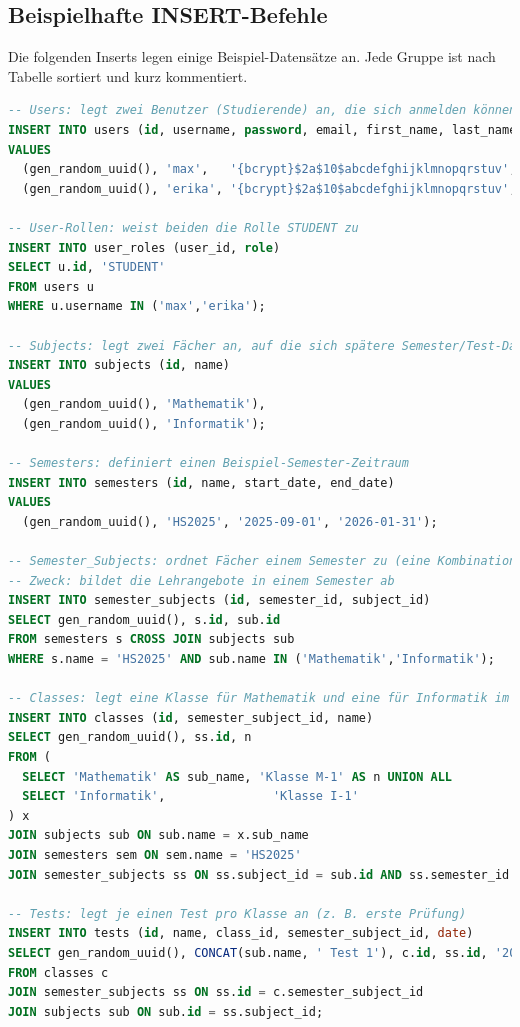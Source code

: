 \documentclass[12pt,a4paper]{article}
\begin{document}
    \subsection{Beispielhafte INSERT-Befehle}
    \noindent Die folgenden Inserts legen einige Beispiel-Datensätze an. Jede Gruppe ist nach Tabelle sortiert und kurz kommentiert.
    \begin{lstlisting}[language=SQL]
-- Users: legt zwei Benutzer (Studierende) an, die sich anmelden können
INSERT INTO users (id, username, password, email, first_name, last_name, active, created_at, updated_at)
VALUES
  (gen_random_uuid(), 'max',   '{bcrypt}$2a$10$abcdefghijklmnopqrstuv', 'max@uni.de',   'Max',   'Mustermann', true, now(), now()),
  (gen_random_uuid(), 'erika', '{bcrypt}$2a$10$abcdefghijklmnopqrstuv', 'erika@uni.de', 'Erika', 'Musterfrau', true, now(), now());

-- User-Rollen: weist beiden die Rolle STUDENT zu
INSERT INTO user_roles (user_id, role)
SELECT u.id, 'STUDENT'
FROM users u
WHERE u.username IN ('max','erika');

-- Subjects: legt zwei Fächer an, auf die sich spätere Semester/Test-Daten beziehen
INSERT INTO subjects (id, name)
VALUES
  (gen_random_uuid(), 'Mathematik'),
  (gen_random_uuid(), 'Informatik');

-- Semesters: definiert einen Beispiel-Semester-Zeitraum
INSERT INTO semesters (id, name, start_date, end_date)
VALUES
  (gen_random_uuid(), 'HS2025', '2025-09-01', '2026-01-31');

-- Semester_Subjects: ordnet Fächer einem Semester zu (eine Kombination pro Zeile)
-- Zweck: bildet die Lehrangebote in einem Semester ab
INSERT INTO semester_subjects (id, semester_id, subject_id)
SELECT gen_random_uuid(), s.id, sub.id
FROM semesters s CROSS JOIN subjects sub
WHERE s.name = 'HS2025' AND sub.name IN ('Mathematik','Informatik');

-- Classes: legt eine Klasse für Mathematik und eine für Informatik im Semester HS2025 an
INSERT INTO classes (id, semester_subject_id, name)
SELECT gen_random_uuid(), ss.id, n
FROM (
  SELECT 'Mathematik' AS sub_name, 'Klasse M-1' AS n UNION ALL
  SELECT 'Informatik',               'Klasse I-1'
) x
JOIN subjects sub ON sub.name = x.sub_name
JOIN semesters sem ON sem.name = 'HS2025'
JOIN semester_subjects ss ON ss.subject_id = sub.id AND ss.semester_id = sem.id;

-- Tests: legt je einen Test pro Klasse an (z. B. erste Prüfung)
INSERT INTO tests (id, name, class_id, semester_subject_id, date)
SELECT gen_random_uuid(), CONCAT(sub.name, ' Test 1'), c.id, ss.id, '2025-10-15'
FROM classes c
JOIN semester_subjects ss ON ss.id = c.semester_subject_id
JOIN subjects sub ON sub.id = ss.subject_id;


\end{lstlisting}
\end{document}
